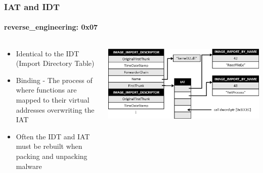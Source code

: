 \documentclass[aspectratio=169]{beamer}
\begin{document}
\begin{frame}
  \frametitle{IAT and IDT}
  \framesubtitle{reverse\_engineering: 0x07}
  \begin{columns}
    \begin{column}{.4\textwidth}
      \begin{itemize}
        \item{Identical to the IDT (Import Directory Table)}
        \item{Binding - The process of where functions are mapped to their
            virtual addresses overwriting the IAT}
        \item{Often the IDT and IAT must be rebuilt when packing and unpacking malware}
      \end{itemize}
    \end{column}
    \hfill
    \begin{column}{.6\textwidth}
      \begin{center}
        \includegraphics[scale=0.2]{IAT}
      \end{center}
    \end{column}
  \end{columns}
\end{frame}
\end{document}

